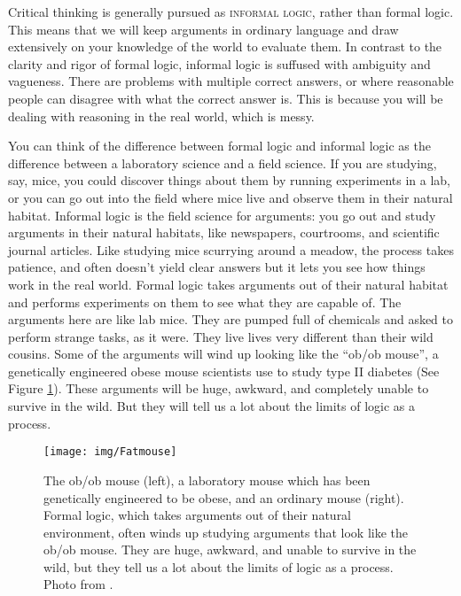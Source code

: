 Critical thinking is generally pursued as \textsc{\gls{informal logic}}, rather than formal logic. This means that we will keep arguments in ordinary language and draw extensively on your knowledge of the world to evaluate them. In contrast to the clarity and rigor of formal logic, informal logic is suffused with ambiguity and vagueness. There are problems  with multiple correct answers, or where reasonable people can disagree with what the correct answer is. This is because you will be dealing with reasoning in the real world, which is messy. \label{messiness_warning} \label{ver_var} 
  

You can think of the difference between formal logic and informal logic as the difference between a laboratory science and a field science. \label{lab_vs._field_science} If you are studying, say, mice, you could discover things about them by running experiments in a lab, or you can go out into the field where mice live and observe them in their natural habitat.  Informal logic is the field science for arguments: you go out and study arguments in their natural habitats, like newspapers, courtrooms, and scientific journal articles. Like studying mice scurrying around a meadow, the process takes patience, and often doesn't yield clear answers but it lets you see how things work in the real world. Formal logic takes arguments out of their natural habitat and performs experiments on them to see what they are capable of. The arguments here are like lab mice. They are pumped full of chemicals and asked to perform strange tasks, as it were. They live lives very different than their wild cousins. Some of the arguments will wind up looking like the ``ob/ob mouse'', a genetically engineered obese mouse scientists use to study type II diabetes (See Figure \ref{fig:ob_ob_mouse}). These arguments will be huge, awkward, and completely unable to survive in the wild. But they will tell us a lot about the limits of logic as a process.

\begin{figure}
\begin{mdframed}[style=mytableclearbox]
\begin{center}
\texttt{[image: img/Fatmouse]}
\end{center}
\end{mdframed}
\caption{The ob/ob mouse (left), a laboratory mouse which has been genetically engineered to be obese, and an ordinary mouse (right). Formal logic, which takes arguments out of their natural environment, often winds up studying arguments that look like the ob/ob mouse. They are huge, awkward, and unable to survive in the wild, but they tell us a lot about the limits of logic as a process. Photo from \cite{WikimediaCommons2006}.}
\label{fig:ob_ob_mouse}
\end{figure}


